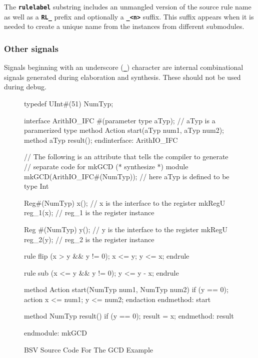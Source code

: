\documentclass{article}
\newcommand{\tbd}[1]{{\sf TBD: #1}}
\newenvironment{libverbatim}
  {\small
   \verbatim}
  {\endverbatim
  }
\newenvironment{fminipage}[1][6 in]
  {\begin{lrbox}{\fminibox}\begin{minipage}[c]{6 in}}
  {\end{minipage}\end{lrbox}\fbox{\usebox{\fminibox}}}
\begin{document}
The {\bf\tt rulelabel} substring includes an unmangled version of the
source rule name as well as a {\bf\tt RL\_} prefix and optionally a
{\bf\tt \_<n>} suffix. This suffix appears when it is needed to create a
unique name from the instances from different submodules.




\subsubsection{Other signals}

Signals beginning with an underscore ({\bf\tt \_}) character are internal
combinational signals generated during elaboration and synthesis. These
should not be used during debug.

\begin{figure}
\begin{fminipage}
\begin{libverbatim}
typedef UInt#(51) NumTyp;

interface ArithIO_IFC #(parameter type aTyp); // aTyp is a paramerized type
    method Action start(aTyp num1, aTyp num2);
    method aTyp result();
endinterface: ArithIO_IFC

// The following is an attribute that tells the compiler to generate
// separate code for mkGCD
(* synthesize *)
module mkGCD(ArithIO_IFC#(NumTyp)); // here aTyp is defined to be type Int

    Reg#(NumTyp) x(); // x is the interface to the register
    mkRegU reg_1(x);  // reg_1 is the register instance

    Reg #(NumTyp) y(); // y is the interface to the register
    mkRegU reg_2(y);   // reg_2 is the register instance

    rule flip (x > y && y != 0);
        x <= y;
        y <= x;
    endrule

    rule sub (x <= y && y != 0);
        y <= y - x;
    endrule

    method Action start(NumTyp num1, NumTyp num2) if (y == 0);
        action
            x <= num1;
            y <= num2;
        endaction
    endmethod: start

    method NumTyp result() if (y == 0);
        result = x;
    endmethod: result

endmodule: mkGCD
\end{libverbatim}
\end{fminipage}
  \caption{\label{gcd_bsv-fig}BSV Source Code For The GCD Example}
\end{figure}
\end{document}
